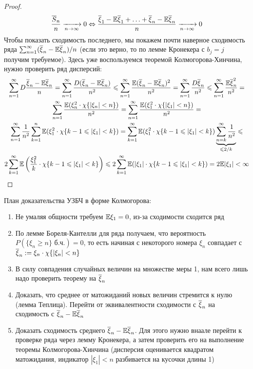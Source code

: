 \begin{proof}
	\[
		\frac{\overline{S}_n}{n} \xrightarrow[n \to \infty]{} 0 \Leftrightarrow \frac{\overline{\xi}_1 - \mathbb{E}\overline{\xi}_1 + \ldots + \overline{\xi}_n - \mathbb{E}\overline{\xi}_n}{n} \xrightarrow[n \to \infty]{} 0
	\]
	Чтобы показать сходимость последнего, мы покажем почти наверное сходимость ряда $\sum_{n = 1}^\infty (\overline{\xi}_n - \mathbb{E}\overline{\xi}_n) / n$ (если это верно, то по лемме Кронекера с $b_j = j$ получим требуемое). Здесь уже воспользуемся теоремой Колмогорова-Хинчина, нужно проверить ряд дисперсий:
	\begin{multline*}
		\sum_{n = 1}^\infty D\frac{\overline{\xi}_n - \mathbb{E}\overline{\xi}_n}{n} = \sum_{n = 1}^\infty \frac{D(\overline{\xi}_n - \mathbb{E}\overline{\xi}_n)}{n^2} \leqslant \sum_{n = 1}^\infty \frac{\mathbb{E}(\overline{\xi}_n - \mathbb{E}\overline{\xi}_n)^2}{n^2} = \sum_{n = 1}^\infty \frac{D\overline{\xi}_n}{n^2} \leqslant \sum_{n = 1}^\infty \frac{\mathbb{E}\overline{\xi}_n^2}{n^2} =
		\\
		\sum_{n = 1}^\infty \frac{\mathbb{E}(\xi_n^2 \cdot \chi\{|\xi_n| < n\})}{n^2} = \sum_{n = 1}^\infty \frac{\mathbb{E}(\xi_1^2 \cdot \chi\{|\xi_1| < n\})}{n^2} =
		\\
		\sum_{n = 1}^\infty \frac{1}{n^2} \sum_{k = 1}^n \mathbb{E}(\xi_1^2 \cdot \chi\{k - 1 \leqslant |\xi_1| < k\}) = \sum_{k = 1}^\infty \mathbb{E}(\xi_1^2 \cdot \chi\{k - 1 \leqslant |\xi_1| < k\}) \underbrace{\sum_{n = k}^\infty \frac{1}{n^2}}_{\leqslant 2 / k} \leqslant
		\\
		2\sum_{k = 1}^\infty \mathbb{E}\left(\frac{\xi_1^2}{k} \cdot \chi\{k - 1 \leqslant |\xi_1| < k\}\right) \leqslant 2 \sum_{k = 1}^\infty \mathbb{E}(|\xi_1| \cdot \chi\{k - 1 \leqslant |\xi_1| < k\}) = 2\mathbb{E} |\xi_1| < \infty
	\end{multline*}
\end{proof}

\begin{anote}
	План доказательства УЗБЧ в форме Колмогорова:
	\begin{enumerate}
		\item Не умаляя общности требуем $\mathbb{E}\xi_1 = 0$, из-за сходимости сходится ряд
		
		\item По лемме Бореля-Кантелли для ряда получаем, что вероятность $P(\{\xi_n \ge n\} \text{ б.ч.}) = 0$, то есть начиная с некоторого номера $\xi_n$ совпадает с $\overline{\xi}_n := \xi_n \cdot \chi\{|\xi_n| < n\}$
		
		\item В силу совпадения случайных величин на множестве меры 1, нам всего лишь надо проверить теорему на $\overline{\xi}_n$
		
		\item Доказать, что среднее от матожиданий новых величин стремится к нулю (лемма Теплица). Перейти от эквивалентности сходимости с $\overline{\xi}_n$ на сходимость с $\overline{\xi}_n - \mathbb{E}\overline{\xi}_n$
		
		\item Доказать сходимость среднего $\overline{\xi}_n - \mathbb{E}\overline{\xi}_n$. Для этого нужно внаале перейти к проверке ряда через лемму Кронекера, а затем проверить его на выполнение теоремы Колмогорова-Хинчина (дисперсия оценивается квадратом матожидания, индикатор $|\xi_1| < n$ разбивается на кусочки длины 1)
	\end{enumerate}
\end{anote}